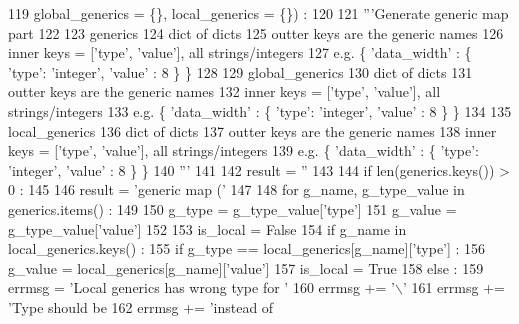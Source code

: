 \begin{DoxyCode}
119   global\_generics = \{\}, local\_generics = \{\}) :
120 
121   \textcolor{stringliteral}{'''Generate generic map part}
122 \textcolor{stringliteral}{}
123 \textcolor{stringliteral}{    generics}
124 \textcolor{stringliteral}{      dict of dicts}
125 \textcolor{stringliteral}{      outter keys are the generic names}
126 \textcolor{stringliteral}{      inner keys = ['type', 'value'], all strings/integers}
127 \textcolor{stringliteral}{      e.g. \{ 'data\_width' : \{ 'type': 'integer', 'value' : 8 \} \}}
128 \textcolor{stringliteral}{}
129 \textcolor{stringliteral}{    global\_generics}
130 \textcolor{stringliteral}{      dict of dicts}
131 \textcolor{stringliteral}{      outter keys are the generic names}
132 \textcolor{stringliteral}{      inner keys = ['type', 'value'], all strings/integers}
133 \textcolor{stringliteral}{      e.g. \{ 'data\_width' : \{ 'type': 'integer', 'value' : 8 \} \}}
134 \textcolor{stringliteral}{}
135 \textcolor{stringliteral}{    local\_generics}
136 \textcolor{stringliteral}{      dict of dicts}
137 \textcolor{stringliteral}{      outter keys are the generic names}
138 \textcolor{stringliteral}{      inner keys = ['type', 'value'], all strings/integers}
139 \textcolor{stringliteral}{      e.g. \{ 'data\_width' : \{ 'type': 'integer', 'value' : 8 \} \}}
140 \textcolor{stringliteral}{  '''}
141 
142   result = \textcolor{stringliteral}{''}
143 
144   \textcolor{keywordflow}{if} len(generics.keys()) > 0 :
145 
146     result = \textcolor{stringliteral}{'generic map ('}
147 
148     \textcolor{keywordflow}{for} g\_name, g\_type\_value \textcolor{keywordflow}{in} generics.items() :
149 
150       g\_type = g\_type\_value[\textcolor{stringliteral}{'type'}]
151       g\_value = g\_type\_value[\textcolor{stringliteral}{'value'}]
152 
153       is\_local = \textcolor{keyword}{False}
154       \textcolor{keywordflow}{if} g\_name \textcolor{keywordflow}{in} local\_generics.keys() :
155         \textcolor{keywordflow}{if} g\_type == local\_generics[g\_name][\textcolor{stringliteral}{'type'}] :
156           g\_value = local\_generics[g\_name][\textcolor{stringliteral}{'value'}]
157           is\_local = \textcolor{keyword}{True}
158         \textcolor{keywordflow}{else} :
159           errmsg = \textcolor{stringliteral}{'Local generics has wrong type for '}
160           errmsg += \textcolor{stringliteral}{'\(\backslash\)'%
161           errmsg += \textcolor{stringliteral}{'Type should be %
162           errmsg += \textcolor{stringliteral}{'instead of %
}}}
\end{DoxyCode}
